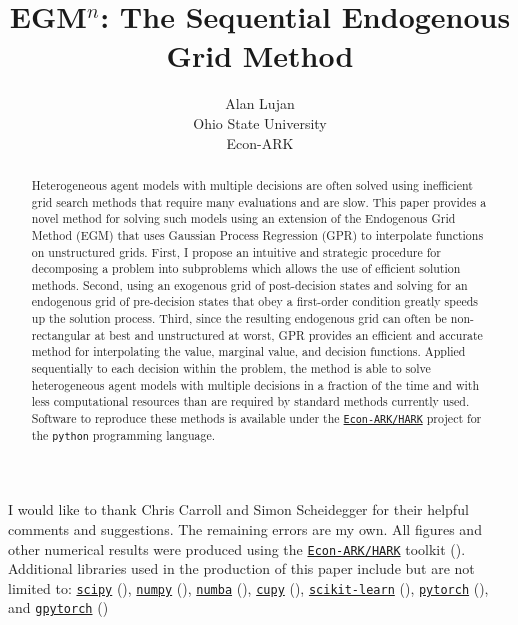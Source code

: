\documentclass{article}
\title{EGM$^n$: The Sequential Endogenous Grid Method}
\date{\displaydate{articleDate}}
\author{Alan Lujan\footnotemark[1]\\
Ohio State University\\Econ-ARK\\}
\begin{document}
\maketitle
{}

\begin{abstract}
Heterogeneous agent models with multiple decisions are often solved using inefficient grid search methods that require many evaluations and are slow.
This paper provides a novel method for solving such models using an extension of the Endogenous Grid Method (EGM) that uses Gaussian Process Regression (GPR) to interpolate functions on unstructured grids.
First, I propose an intuitive and strategic procedure for decomposing a problem into subproblems which allows the use of efficient solution methods.
Second, using an exogenous grid of post-decision states and solving for an endogenous grid of pre-decision states that obey a first-order condition greatly speeds up the solution process.
Third, since the resulting endogenous grid can often be non-rectangular at best and unstructured at worst, GPR provides an efficient and accurate method for interpolating the value, marginal value, and decision functions.
Applied sequentially to each decision within the problem, the method is able to solve heterogeneous agent models with multiple decisions in a fraction of the time and with less computational resources than are required by standard methods currently used.
Software to reproduce these methods is available under the \href{https://econ-ark.org/}{\texttt{Econ-ARK/HARK}} project for the \texttt{python} programming language.
\end{abstract}


I would like to thank Chris Carroll and Simon Scheidegger for their helpful comments and suggestions. The remaining errors are my own. All figures and other numerical results were produced using the \href{https://econ-ark.org/}{\texttt{Econ-ARK/HARK}} toolkit (\citet{Carroll2018}). Additional libraries used in the production of this paper include but are not limited to: \href{https://www.scipy.org/}{\texttt{scipy}} (\citet{Virtanen2020}), \href{https://www.numpy.org/}{\texttt{numpy}} (\citet{Harris2020}), \href{https://numba.pydata.org/}{\texttt{numba}} (\citet{Lam2015}), \href{https://cupy.dev/}{\texttt{cupy}} (\citet{Okuta2017}), \href{https://scikit-learn.org/}{\texttt{scikit-learn}} (\citet{Pedregosa2011}), \href{https://pytorch.org/}{\texttt{pytorch}} (\citet{Paszke2019}), and \href{https://gpytorch.ai/}{\texttt{gpytorch}} (\citet{Gardner2018})
\end{document}
